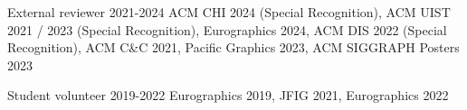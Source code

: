 

\begin{cventries}

 \cventry
  	{External reviewer} %
    {2021-2024} %
    {ACM CHI 2024 (Special Recognition), ACM UIST 2021 / 2023 (Special Recognition), Eurographics 2024, ACM DIS 2022 (Special Recognition), ACM C\&C 2021, Pacific Graphics 2023, ACM SIGGRAPH Posters 2023}

  \cventry
  	{Student volunteer} %
    {2019-2022} %
    {Eurographics 2019, JFIG 2021, Eurographics 2022}


\end{cventries}
